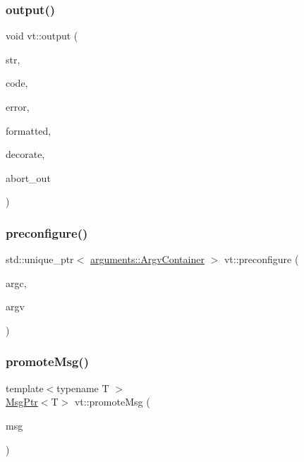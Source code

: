 \mbox{\label{namespacevt_ad3ca3e8710dd3c8badff897f8de3c858}} 
\subsubsection{\texorpdfstring{output()}{output()}}
{\footnotesize\ttfamily void vt\+::output (\begin{DoxyParamCaption}\item[{std\+::string const}]{str,  }\item[{int32\+\_\+t const}]{code,  }\item[{bool}]{error,  }\item[{bool}]{formatted,  }\item[{bool}]{decorate,  }\item[{bool}]{abort\+\_\+out }\end{DoxyParamCaption})}

\mbox{\label{namespacevt_a92861d98501258a2800b90420bb116ff}} 
\subsubsection{\texorpdfstring{preconfigure()}{preconfigure()}}
{\footnotesize\ttfamily std\+::unique\+\_\+ptr$<$ \hyperlink{structvt_1_1arguments_1_1_argv_container}{arguments\+::\+Argv\+Container} $>$ vt\+::preconfigure (\begin{DoxyParamCaption}\item[{int \&}]{argc,  }\item[{char $\ast$$\ast$\&}]{argv }\end{DoxyParamCaption})}

\mbox{\label{namespacevt_af00ebdeb74801e5658cf5726193d5753}} 
\subsubsection{\texorpdfstring{promote\+Msg()}{promoteMsg()}\hspace{0.1cm}{\footnotesize\ttfamily [1/2]}}
{\footnotesize\ttfamily template$<$typename T $>$ \\
\hyperlink{namespacevt_a9f5ebd62ee9d6dd8829e3e1cc4f858e9}{Msg\+Ptr}$<$T$>$ vt\+::promote\+Msg (\begin{DoxyParamCaption}\item[{\hyperlink{namespacevt_a9f5ebd62ee9d6dd8829e3e1cc4f858e9}{Msg\+Ptr}$<$ T $>$}]{msg }\end{DoxyParamCaption})\hspace{0.3cm}{\ttfamily [inline]}}

